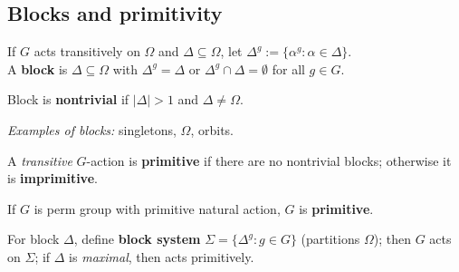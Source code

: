 \subsection{Blocks and primitivity}

\begin{slide}
    \begin{definition}[block]
        \vspace{0pt}
        If $G$ acts transitively on $\Omega$ and $\Delta \subseteq \Omega$, let $\Delta^g := \{\alpha^g : \alpha \in \Delta\}$. \\
        A \textbf{block} is $\Delta \subseteq \Omega$ with $\Delta^g = \Delta$ or $\Delta^g \cap \Delta = \emptyset$ for all $g \in G$.

        Block is \textbf{nontrivial} if $|\Delta| > 1$ and $\Delta \neq \Omega$.
    \end{definition}

    \textit{Examples of blocks:} singletons, $\Omega$, orbits.

    \begin{definition}[primitivity]
        \vspace{0pt}
        A \textit{transitive} $G$-action is \textbf{primitive} if there are no nontrivial blocks; otherwise it is \textbf{imprimitive}.

        If $G$ is perm group with primitive natural action, $G$ is \textbf{primitive}.
    \end{definition}

    For block $\Delta$, define \textbf{block system} $\Sigma = \{\Delta^g : g \in G\}$ (partitions $\Omega$); then $G$ acts on $\Sigma$; if $\Delta$ is \textit{maximal}, then acts primitively.
\end{slide}

